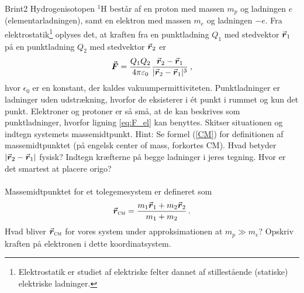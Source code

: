 \begin{opgave}{Brint}{2}
Hydrogenisotopen $^1$H består af en proton med massen $m_p$ og ladningen $e$ (elementarladningen), samt en elektron med massen $m_e$ og ladningen $-e$. Fra elektrostatik\footnote{Elektrostatik er studiet af elektriske felter dannet af stillestående (statiske) elektriske ladninger.} oplyses det, at kraften fra en punktladning $Q_1$ med stedvektor ${\vec{\boldsymbol{r}}}_1$ på en punktladning $Q_2$ med stedvektor ${\vec{\boldsymbol{r}}}_2$ er
\begin{align} \label{eq:F_el}
	{\vec{\boldsymbol{F}}} = \frac{Q_1Q_2}{4\pi\varepsilon_0}\frac{{\vec{\boldsymbol{r}}}_2-{\vec{\boldsymbol{r}}}_1}{|{\vec{\boldsymbol{r}}}_2-{\vec{\boldsymbol{r}}}_1|^3} \: ,
\end{align}
hvor $\epsilon_0$ er en konstant, der kaldes vakuumpermittiviteten. Punktladninger er ladninger uden udstrækning, hvorfor de eksisterer i ét punkt i rummet og kun det punkt. Elektroner og protoner er så små, at de kan beskrives som punktladninger, hvorfor ligning \eqref{eq:F_el} kan benyttes.
\opg Skitser situationen og indtegn systemets massemidtpunkt. Hint: Se formel (\ref{CM}) for definitionen af massemidtpunktet (på engelsk center of mass, forkortes CM).
\opg Hvad betyder $|{\vec{\boldsymbol{r}}}_2-{\vec{\boldsymbol{r}}}_1|$ fysisk?
\opg Indtegn kræfterne på begge ladninger i jeres tegning.
\opg Hvor er det smartest at placere origo? \\ \\
Massemidtpunktet for et tolegemesystem er defineret som
\begin{align}
\label{CM}
	{\vec{\boldsymbol{r}}}_\textsc{cm} = \frac{m_1{\vec{\boldsymbol{r}}}_1 + m_2{\vec{\boldsymbol{r}}}_2}{m_1 + m_2} \, .
\end{align}
\opg Hvad bliver ${\vec{\boldsymbol{r}}}_{\textsc{cm}}$ for vores system under approksimationen at $m_p \gg m_e$?
\opg Opskriv kraften på elektronen i dette koordinatsystem.
\end{opgave}
%
%
